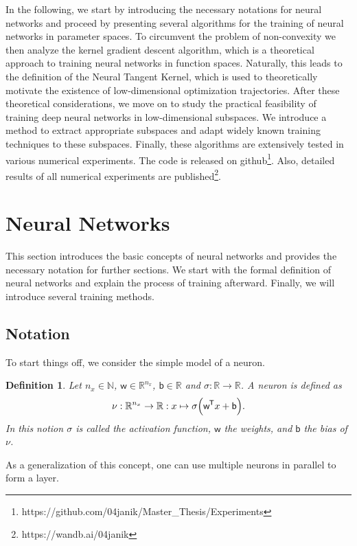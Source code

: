 \documentclass[11pt, a4paper]{article}
\newtheorem{definition}[theorem]{Definition}
\newcommand{\N}{\mathbb{N}}
\newcommand{\R}{\mathbb{R}}
\renewcommand{\b}{\mathsf{b}}
\newcommand{\w}{\mathsf{w}}
\newcommand*{\tr}{^{\mkern-1.5mu\mathsf{T}}}
\begin{document}
In the following, we start by introducing the necessary notations for neural networks and proceed by presenting several algorithms for the training of neural networks in parameter spaces. To circumvent the problem of non-convexity we then analyze the kernel gradient descent algorithm, which is a theoretical approach to training neural networks in function spaces. Naturally, this leads to the definition of the Neural Tangent Kernel, which is used to theoretically motivate the existence of low-dimensional optimization trajectories. After these theoretical considerations, we move on to study the practical feasibility of training deep neural networks in low-dimensional subspaces. We introduce a method to extract appropriate subspaces and adapt widely known training techniques to these subspaces. Finally, these algorithms are extensively tested in various numerical experiments. The code is released on github\footnote{https://github.com/04janik/Master\_Thesis/Experiments}. Also, detailed results of all numerical experiments are published\footnote{https://wandb.ai/04janik}.

\section{Neural Networks}

This section introduces the basic concepts of neural networks and provides the necessary notation for further sections. We start with the formal definition of neural networks and explain the process of training afterward. Finally, we will introduce several training methods.

\subsection{Notation} \label{sec:notation}

To start things off, we consider the simple model of a neuron. 

\begin{definition}
Let $n_x \in \N$, $\w \in \R^{n_x}$, $\b \in \R$ and $\sigma: \R \to \R$. A neuron is defined as
\[ \nu : \R^{n_x} \to \R : x \mapsto \sigma \Big ( \w \tr x + \b \Big ).\] %
In this notion $\sigma$ is called the activation function, $\w$ the weights, and $\b$ the bias of $\nu$.
\end{definition}

As a generalization of this concept, one can use multiple neurons in parallel to form a layer.
\end{document}
